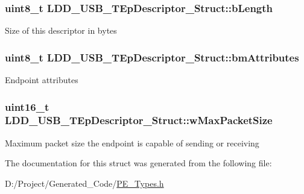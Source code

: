 \subsubsection[{b\+Length}]{\setlength{\rightskip}{0pt plus 5cm}uint8\+\_\+t L\+D\+D\+\_\+\+U\+S\+B\+\_\+\+T\+Ep\+Descriptor\+\_\+\+Struct\+::b\+Length}\label{struct_l_d_d___u_s_b___t_ep_descriptor___struct_ad4cc2b6088c7fb913f40eada94098393}
Size of this descriptor in bytes \hypertarget{struct_l_d_d___u_s_b___t_ep_descriptor___struct_a7a3e6205355d7fa84899f23ac8e58490}{}
\subsubsection[{bm\+Attributes}]{\setlength{\rightskip}{0pt plus 5cm}uint8\+\_\+t L\+D\+D\+\_\+\+U\+S\+B\+\_\+\+T\+Ep\+Descriptor\+\_\+\+Struct\+::bm\+Attributes}\label{struct_l_d_d___u_s_b___t_ep_descriptor___struct_a7a3e6205355d7fa84899f23ac8e58490}
Endpoint attributes \hypertarget{struct_l_d_d___u_s_b___t_ep_descriptor___struct_a19e3e6b0524f2fcd25377f008c94c3c6}{}
\subsubsection[{w\+Max\+Packet\+Size}]{\setlength{\rightskip}{0pt plus 5cm}uint16\+\_\+t L\+D\+D\+\_\+\+U\+S\+B\+\_\+\+T\+Ep\+Descriptor\+\_\+\+Struct\+::w\+Max\+Packet\+Size}\label{struct_l_d_d___u_s_b___t_ep_descriptor___struct_a19e3e6b0524f2fcd25377f008c94c3c6}
Maximum packet size the endpoint is capable of sending or receiving 

The documentation for this struct was generated from the following file\+:\begin{DoxyCompactItemize}
\item 
D\+:/\+Project/\+Generated\+\_\+\+Code/\hyperlink{_p_e___types_8h}{P\+E\+\_\+\+Types.\+h}\end{DoxyCompactItemize}

